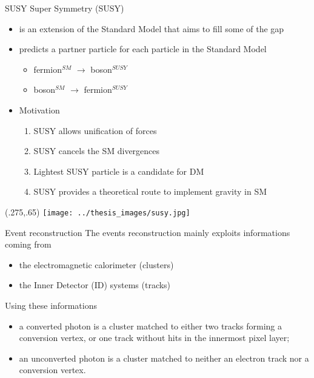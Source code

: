 \documentclass[10pt,UKenglish, leqno, xcolor = dvipsnames]{beamer}
\begin{document}
		\begin{frame}{SUSY}
			\vspace{.2cm}
			Super Symmetry (SUSY)
			\begin{itemize}
				\item is an extension of the Standard Model that aims to fill some of the gap
				\item predicts a partner particle for each particle in the Standard Model
				\begin{itemize}
					\item fermion$^{SM}$ $\to$ boson$^{SUSY}$
					\item boson$^{SM}$ $\to$ fermion$^{SUSY}$
				\end{itemize}
				\item Motivation
				\begin{enumerate}
					\item SUSY allows unification of forces
					\item SUSY cancels the SM divergences
					\item Lightest SUSY particle is a candidate for DM
					\item SUSY provides a theoretical route to implement gravity in SM
				\end{enumerate}
			\end{itemize}
			\begin{textblock}{1}(.275,.65)
				\texttt{[image: ../thesis\_images/susy.jpg]}	
			\end{textblock}
		\end{frame}
	
		\begin{frame}{Event reconstruction}
			\vfill
			The events reconstruction mainly exploits informations coming from
			\begin{itemize}
				\item the electromagnetic calorimeter (clusters)
				\item the Inner Detector (ID) systems (tracks)
			\end{itemize}
			
			Using these informations
			\begin{itemize}
				\item a converted photon is a cluster matched to either two tracks forming a conversion vertex, or one track without hits in the innermost pixel layer;
				\item an unconverted photon is a cluster matched to neither an electron track nor a conversion vertex.
			\end{itemize}
			\vfill
		\end{frame}
	
\end{document}
